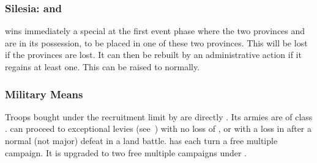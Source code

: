 \subsubsection{Silesia: 
  and }
\aparag \PRU wins immediately a special \MNU\facemoins at the first
event phase where the two provinces  and
 are in its possession, to be placed in one of these
two provinces.
\bparag This \MNU will be lost if the provinces are lost. It can then be
rebuilt by an administrative action if it regains at least one.
\bparag This \MNU can be raised to \Faceplus normally.
\subsubsection{Military Means}\label{chSpecific:Prussia:Military Means}
\aparag Troops bought under the recruitment limit by \PRU are directly
. Its armies are of class \CAIV.
\aparag \PRU can proceed to exceptional levies
(see~) with no loss of \STAB,
or with a loss in \STAB after a normal (not major) defeat in a land battle.
\aparag \PRU has each turn a free multiple campaign. It is upgraded to
two free multiple campaigns under .



